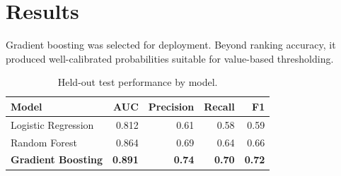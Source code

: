 \section{Results}
Gradient boosting was selected for deployment. Beyond ranking accuracy, it produced
well-calibrated probabilities suitable for value-based thresholding.

\begin{table}[ht]\centering
\caption{Held-out test performance by model.}
\begin{tabularx}{\linewidth}{@{}X r r r r@{}}
\toprule
\textbf{Model} & \textbf{AUC} & \textbf{Precision} & \textbf{Recall} & \textbf{F1}\\
\midrule
Logistic Regression & 0.812 & 0.61 & 0.58 & 0.59\\
Random Forest       & 0.864 & 0.69 & 0.64 & 0.66\\
\textbf{Gradient Boosting} & \textbf{0.891} & \textbf{0.74} & \textbf{0.70} & \textbf{0.72}\\
\bottomrule
\end{tabularx}
\end{table}
